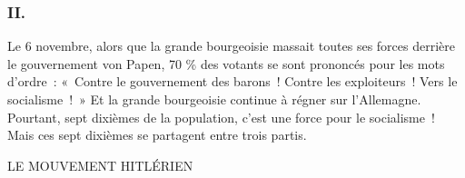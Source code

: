 \documentclass[french,twoside]{book} %
\begin{document}
\subsubsection[{II.}]{II.}
\noindent Le 6 novembre, alors que la grande bourgeoisie massait toutes ses forces derrière le gouvernement von Papen, 70 \% des votants se sont prononcés pour les mots d'ordre : « Contre le gouvernement des barons ! Contre les exploi­teurs ! Vers le socialisme ! » Et la grande bourgeoisie continue à régner sur l'Allemagne. Pourtant, sept dixièmes de la population, c'est une force pour le socialisme ! Mais ces sept dixièmes se partagent entre trois partis.\par

\begin{center}
\noindent \centerline{LE MOUVEMENT HITLÉRIEN}\par
\end{center}
\end{document}
